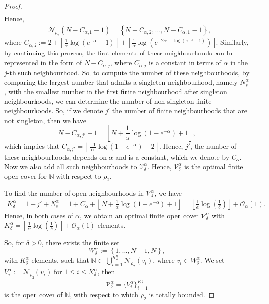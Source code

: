 \documentclass[11pt, reqno]{amsart}
\theoremstyle{plain}%
\theoremstyle{definition}
\theoremstyle{definition}
\def\N{\ensuremath{\mathbb N}}
\numberwithin{equation}{section}
\begin{document}
\begin{proof}
\begin{align*}
\end{align*}
Hence,
\begin{align*}
&\mathcal{N}_{\rho_2}\left(N-C_{\alpha,1}-1\right) =\left\{  N-C_{\alpha,2},\ldots,N-C_{\alpha,1}-1 \right\},\end{align*}
where $C_{\alpha,2}:= 2+\left\lfloor\frac{1}{\alpha}\log\left(e^{-\alpha}+1\right)\right\rfloor+ \left\lfloor\frac{1}{\alpha}\log \left(e^{-2\alpha-\log\left(e^{-\alpha}+1\right)}\right)\right\rfloor$. Similarly, by continuing this process, the first elements of these neighbourhoods can be represented in the form of $N-C_{\alpha,j}$, where $C_{\alpha,j}$ is a constant in terms of $\alpha$ in the $j$-th such neighbourhood. So, to compute the number of these neighbourhoods, by comparing the largest number that admits a singleton neighbourhood, namely $N_s^{\alpha}$, with the smallest number in the first finite neighbourhood after singleton neighbourhoods, we can determine the number of non-singleton finite neighbourhoods. So, if we denote $j'$ the number of finite neighbourhoods that are not singleton, then we have
$$N-C_{\alpha,j'}-1= \left\lfloor N+\frac{1}{\alpha}\log(1-e^{-\alpha}) +1\right\rfloor,$$
which implies that $C_{\alpha,j'}=\left\lfloor\frac{-1}{\alpha}\log(1-e^{-\alpha})-2\right\rfloor$. Hence, $j'$, the number of these neighbourhoods, depends on $\alpha$ and is a constant, which we denote by $C_{\alpha}$. Now we also add all such neighbourhoods to $\mathcal{V}_\delta^{\alpha}$. Hence, $\mathcal{V}_\delta^{\alpha}$ is the optimal finite open cover for $\N$ with respect to ${\rho_2}$.


To find the number of open neighbourhoods in $\mathcal{V}_\delta^{\alpha}$, we have
\begin{align*}
K_\delta^{\alpha}=1+j'+N_s^{\alpha}=1+C_\alpha+ \left\lfloor N+\frac{1}{\alpha}\log(1-e^{-\alpha}) +1\right\rfloor= \left\lfloor \frac{1}{\alpha} \log \left(\frac{1}{\delta}\right)\right\rfloor+\mathcal{O}_\alpha(1).
\end{align*}
Hence, in both cases of $\alpha$, we obtain an optimal finite open cover $\mathcal{V}_\delta^{\alpha}$ with $K_\delta^{\alpha}= \left\lfloor \frac{1}{\alpha} \log \left(\frac{1}{\delta}\right)\right\rfloor+\mathcal{O}_\alpha(1)$ elements.

So, for $\delta>0$, there exists the finite set $$W_\delta^{\alpha}:=\left\{1,\ldots,N-1,N\right\},$$ with $K_\delta^{\alpha}$ elements, such that $\N\subset\bigcup_{i=1}^{K_\delta^{\alpha}}\mathcal{N}_{\rho_2}(v_i)$, where $v_i\in W_\delta^{\alpha}$. We set $V_i^{\alpha}:=\mathcal{N}_{\rho_2}(v_i)$ for $1\le i\le K_\delta^{\alpha} $, then \begin{equation}\label{Def:V_delta d_2+}
    \mathcal{V}_\delta^{\alpha}=\{V_i^{\alpha}\}_{i=1}^{K_\delta^{\alpha}}
\end{equation} is the open cover of $\N$, with respect to which ${\rho_2}$ is totally bounded.


\end{proof}
\end{document}
